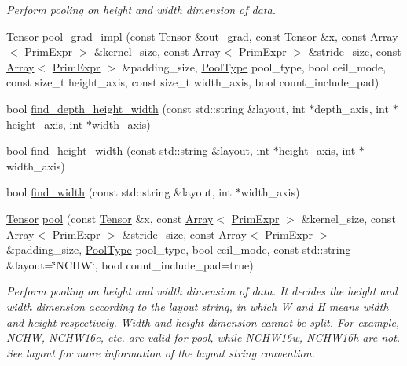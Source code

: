 \begin{DoxyCompactItemize}
\begin{DoxyCompactList}\small\item\em Perform pooling on height and width dimension of data. \end{DoxyCompactList}\item 
\hyperlink{classtvm_1_1te_1_1Tensor}{Tensor} \hyperlink{namespacetopi_1_1nn_af2c25e8b3ab3cac1c2896cb750838337}{pool\+\_\+grad\+\_\+impl} (const \hyperlink{classtvm_1_1te_1_1Tensor}{Tensor} \&out\+\_\+grad, const \hyperlink{classtvm_1_1te_1_1Tensor}{Tensor} \&x, const \hyperlink{classtvm_1_1Array}{Array}$<$ \hyperlink{classtvm_1_1PrimExpr}{Prim\+Expr} $>$ \&kernel\+\_\+size, const \hyperlink{classtvm_1_1Array}{Array}$<$ \hyperlink{classtvm_1_1PrimExpr}{Prim\+Expr} $>$ \&stride\+\_\+size, const \hyperlink{classtvm_1_1Array}{Array}$<$ \hyperlink{classtvm_1_1PrimExpr}{Prim\+Expr} $>$ \&padding\+\_\+size, \hyperlink{namespacetopi_1_1nn_ac531cfce9c3a031fa25cfb6ed1f9b95b}{Pool\+Type} pool\+\_\+type, bool ceil\+\_\+mode, const size\+\_\+t height\+\_\+axis, const size\+\_\+t width\+\_\+axis, bool count\+\_\+include\+\_\+pad)
\item 
bool \hyperlink{namespacetopi_1_1nn_a2e81a7938a1e3f273e184e2373d9138d}{find\+\_\+depth\+\_\+height\+\_\+width} (const std\+::string \&layout, int $\ast$depth\+\_\+axis, int $\ast$height\+\_\+axis, int $\ast$width\+\_\+axis)
\item 
bool \hyperlink{namespacetopi_1_1nn_a428e0ba6800ef89b8c1f97f0245e244d}{find\+\_\+height\+\_\+width} (const std\+::string \&layout, int $\ast$height\+\_\+axis, int $\ast$width\+\_\+axis)
\item 
bool \hyperlink{namespacetopi_1_1nn_ab1f1f9f86723b30bb8997615e1d63ca8}{find\+\_\+width} (const std\+::string \&layout, int $\ast$width\+\_\+axis)
\item 
\hyperlink{classtvm_1_1te_1_1Tensor}{Tensor} \hyperlink{namespacetopi_1_1nn_ac1708b3aa1a677f56a4063a568945d98}{pool} (const \hyperlink{classtvm_1_1te_1_1Tensor}{Tensor} \&x, const \hyperlink{classtvm_1_1Array}{Array}$<$ \hyperlink{classtvm_1_1PrimExpr}{Prim\+Expr} $>$ \&kernel\+\_\+size, const \hyperlink{classtvm_1_1Array}{Array}$<$ \hyperlink{classtvm_1_1PrimExpr}{Prim\+Expr} $>$ \&stride\+\_\+size, const \hyperlink{classtvm_1_1Array}{Array}$<$ \hyperlink{classtvm_1_1PrimExpr}{Prim\+Expr} $>$ \&padding\+\_\+size, \hyperlink{namespacetopi_1_1nn_ac531cfce9c3a031fa25cfb6ed1f9b95b}{Pool\+Type} pool\+\_\+type, bool ceil\+\_\+mode, const std\+::string \&layout=\char`\"{}N\+C\+HW\char`\"{}, bool count\+\_\+include\+\_\+pad=true)
\begin{DoxyCompactList}\small\item\em Perform pooling on height and width dimension of data. It decides the height and width dimension according to the layout string, in which \textquotesingle{}W\textquotesingle{} and \textquotesingle{}H\textquotesingle{} means width and height respectively. Width and height dimension cannot be split. For example, N\+C\+HW, N\+C\+H\+W16c, etc. are valid for pool, while N\+C\+H\+W16w, N\+C\+H\+W16h are not. See {\itshape layout} for more information of the layout string convention. \end{DoxyCompactList}\item 

\end{DoxyCompactItemize}

